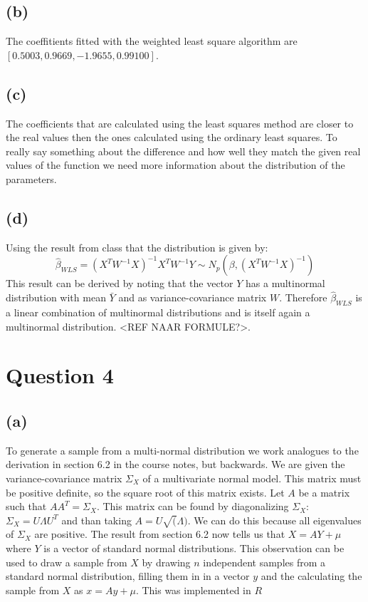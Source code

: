 \documentclass[a4paper]{article}
\begin{document}
\subsection*{(b)}
The coeffitients fitted with the weighted least square algorithm are $[0.5003, 0.9669, -1.9655, 0.99100]$.

\subsection*{(c)}
The coefficients that are calculated using the least squares method are closer to the real values then the ones calculated using the ordinary least squares. To really say something about the difference and how well they match the given real values of the function we need more information about the distribution of the parameters.

\subsection*{(d)}
Using the result from class that the distribution is given by:
\begin{equation*}
	\hat{\beta}_{WLS} = (X^TW^{-1}X)^{-1} X^T W^{-1}Y \sim N_p(\beta, (X^TW^{-1}X)^{-1})
\end{equation*}
This result can be derived by noting that the vector $Y$ has a multinormal distribution with mean $\bar{Y}$ and as variance-covariance matrix $W$. Therefore $\hat{\beta}_{WLS}$ is a linear combination of multinormal distributions and is itself again a multinormal distribution. <REF NAAR FORMULE?>.


\section*{Question 4}
\subsection*{(a)}
To generate a sample from a multi-normal distribution we work analogues to the derivation in section 6.2 in the course notes, but backwards. We are given the variance-covariance matrix $\Sigma_X$ of a multivariate normal model. This matrix must be positive definite, so the square root of this matrix exists. 
Let $A$ be a matrix such that $AA^T=\Sigma_X$. This matrix can be found by diagonalizing $\Sigma_X$: $\Sigma_X=U\Lambda U^T$ and than taking $A = U \sqrt(\Lambda)$. We can do this because all eigenvalues of $\Sigma_X$ are positive.
The result from section 6.2 now tells us that $X = AY + \mu$ where $Y$ is a vector of standard normal distributions.
This observation can be used to draw a sample from $X$ by drawing $n$ independent samples from a standard normal distribution, filling them in in a vector $y$ and the calculating the sample from $X$ as $x=Ay+\mu$. This was implemented in $R$
\end{document}
